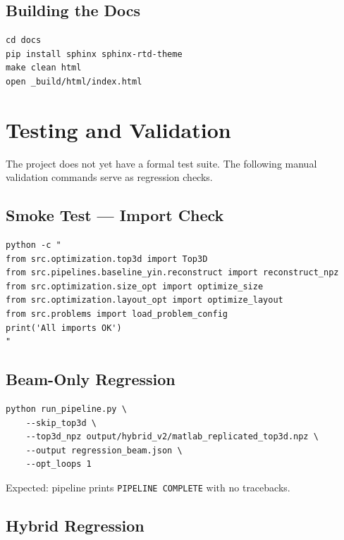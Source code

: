\documentclass[a4paper, 11pt, openany]{report}
\begin{document}
\subsection{Building the Docs}

\begin{lstlisting}[style=bashstyle]
cd docs
pip install sphinx sphinx-rtd-theme
make clean html
open _build/html/index.html
\end{lstlisting}


\section{Testing and Validation}
\label{sec:testing}

The project does not yet have a formal test suite.  The following manual
validation commands serve as regression checks.

\subsection{Smoke Test --- Import Check}

\begin{lstlisting}[style=bashstyle]
python -c "
from src.optimization.top3d import Top3D
from src.pipelines.baseline_yin.reconstruct import reconstruct_npz
from src.optimization.size_opt import optimize_size
from src.optimization.layout_opt import optimize_layout
from src.problems import load_problem_config
print('All imports OK')
"
\end{lstlisting}

\subsection{Beam-Only Regression}

\begin{lstlisting}[style=bashstyle]
python run_pipeline.py \
    --skip_top3d \
    --top3d_npz output/hybrid_v2/matlab_replicated_top3d.npz \
    --output regression_beam.json \
    --opt_loops 1
\end{lstlisting}

Expected: pipeline prints \texttt{PIPELINE COMPLETE} with no tracebacks.

\subsection{Hybrid Regression}
\end{document}
